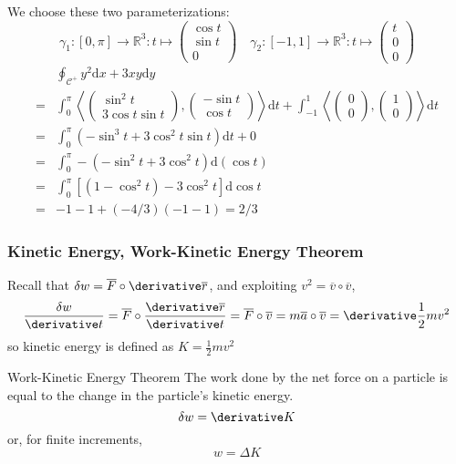 \begin{frame}
We choose these two parameterizations:
\[
\gamma_{1} : [0,\pi] \to \mathbb{R}^{3}: t\mapsto \left(\begin{matrix}\cos t\\\sin t\\0\end{matrix}\right)
\quad
\gamma_{2}: [-1,1]\to \mathbb{R}^{3}: t\mapsto \left(\begin{matrix}t\\0\\0\end{matrix}\right)
\]
\begin{align*}
&\oint_{\mathcal{C}^{+}}y^{2}\mathrm{d}x+3xy\mathrm{d}y\\
=&\int_{0}^{\pi}\left<\left(\begin{matrix}\sin^{2}t\\3\cos t\sin t\end{matrix}\right),\left(\begin{matrix}-\sin t\\\cos t\end{matrix}\right)\right>\mathrm{d}t+\int_{-1}^{1}\left<\left(\begin{matrix}0\\0\end{matrix}\right),\left(\begin{matrix}1\\0\end{matrix}\right)\right>\mathrm{d}t\\
=&\int_{0}^{\pi}(-\sin^{3}t+3\cos^{2}t\sin t)\mathrm{d}t+0\\
=&\int_{0}^{\pi}-(-\sin^{2}t+3\cos^{2}t)\mathrm{d}(\cos t)\\
=&\int_{0}^{\pi}[(1-\cos^{2}t)-3\cos^{2}t]\mathrm{d}\cos t\\
=&-1-1+(-4/3)(-1-1)=2/3
\end{align*}
\end{frame}
\begin{frame}
\frametitle{Kinetic Energy, Work-Kinetic Energy Theorem}
Recall that $\delta w=\overline{F}\circ\derivative\overline{r}$, and exploiting $v^2=\overline{v}\circ\overline{v}$,
\[\frac{\delta w}{\derivative t}=\overline{F}\circ\frac{\derivative \overline{r}}{\derivative t}=\overline{F}\circ\overline{v}=m\overline{a}\circ\overline{v}=\derivative \frac{1}{2}mv^2\]
so \alert{kinetic energy} is defined as $K=\frac{1}{2}mv^2$
\begin{block}{Work-Kinetic Energy Theorem}
The work done by the \alert{net} force on a particle is equal to the \alert{change} in the particle's kinetic energy.
\[\delta w=\derivative K\]
or, for finite increments,
\[w=\Delta K\]
\end{block}
\end{frame}
